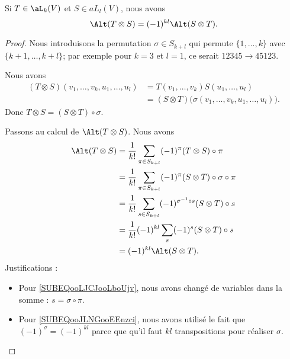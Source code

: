 \begin{lemma}		\label{LEMooIMYIooZIxYRp}
	Si \( T\in\aL_k(V)\) et \( S\in aL_l(V)\), nous avons
	\begin{equation}
		\Alt(T\otimes S)=(-1)^{kl}\Alt(S\otimes T).
	\end{equation}
\end{lemma}

\begin{proof}
	Nous introduisons la permutation \( \sigma\in S_{k+l}\) qui permute \( \{ 1,\ldots,k \}\) avec \( \{ k+1,\ldots,k+l \}\); par exemple pour \( k=3\) et \( l=1\), ce serait \( 12345\to 45123\).

	Nous avons
	\begin{subequations}
		\begin{align}
			(T\otimes S)(v_1,\ldots,v_k,u_1,\ldots,u_l) & =T(v_1,\ldots,v_k)S(u_1,\ldots, u_l)                            \\
			                                            & =(S\otimes T)\big( \sigma(v_1,\ldots,v_k,u_1,\ldots,u_l) \big).
		\end{align}
	\end{subequations}
	Donc \( T\otimes S=(S\otimes T)\circ \sigma\).

	Passons au calcul de \( \Alt(T\otimes S)\). Nous avons
	\begin{subequations}
		\begin{align}
			\Alt(T\otimes S) & =\frac{1}{ k!}\sum_{\pi\in S_{k+l}}(-1)^{\pi}(T\otimes S)\circ\pi                                        \\
			                 & = \frac{1}{ k!}\sum_{\pi\in S_{k+l}}(-1)^{\pi}(S\otimes T)\circ\sigma\circ\pi                            \\
			                 & =\frac{1}{ k!}\sum_{s\in S_{k+l}}(-1)^{\sigma^{-1}\circ s}(S\otimes T)\circ s		\label{SUBEQooLJCJooLboUjv} \\
			                 & =\frac{1}{ k!}(-1)^{kl}\sum_s(-1)^{s}(S\otimes T)\circ s			\label{SUBEQooJLNGooEEnzci}                      \\
			                 & =(-1)^{kl}\Alt(S\otimes T).
		\end{align}
	\end{subequations}
	Justifications :
	\begin{itemize}
		\item
		      Pour \eqref{SUBEQooLJCJooLboUjv}, nous avons changé de variables dans la somme : \( s=\sigma\circ \pi\).
		\item
		      Pour \eqref{SUBEQooJLNGooEEnzci}, nous avons utilisé le fait que \( (-1)^{\sigma}=(-1)^{kl}\) parce que qu'il faut \( kl\) transpositions pour réaliser \( \sigma\).
	\end{itemize}
\end{proof}

